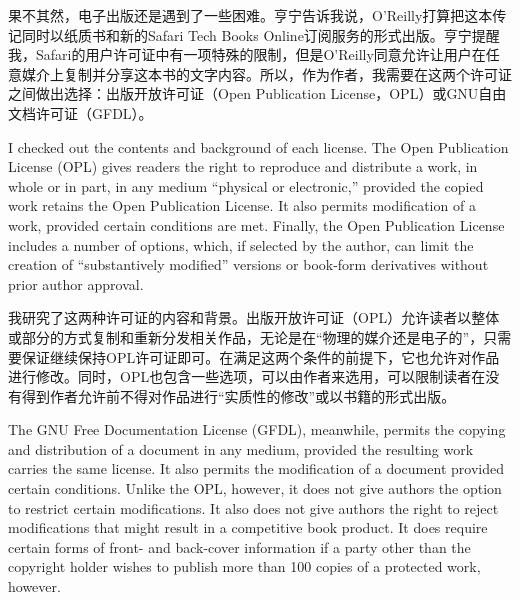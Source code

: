 \ifdefined\chs
果不其然，电子出版还是遇到了一些困难。亨宁告诉我说，O'Reilly打算把这本传记同时以纸质书和新的Safari Tech Books Online订阅服务的形式出版。亨宁提醒我，Safari的用户许可证中有一项特殊的限制，但是O'Reilly同意允许让用户在任意媒介上复制并分享这本书的文字内容。所以，作为作者，我需要在这两个许可证之间做出选择：出版开放许可证（Open Publication License，OPL）或GNU自由文档许可证（GFDL）。
\fi

\ifdefined\eng
I checked out the contents and background of each license. The Open Publication License (OPL) gives readers the right to reproduce and distribute a work, in whole or in part, in any medium ``physical or electronic,'' provided the copied work retains the Open Publication License. It also permits modification of a work, provided certain conditions are met. Finally, the Open Publication License includes a number of options, which, if selected by the author, can limit the creation of ``substantively modified'' versions or book-form derivatives without prior author approval.
\fi

\ifdefined\chs
我研究了这两种许可证的内容和背景。出版开放许可证（OPL）允许读者以整体或部分的方式复制和重新分发相关作品，无论是在``物理的媒介还是电子的''，只需要保证继续保持OPL许可证即可。在满足这两个条件的前提下，它也允许对作品进行修改。同时，OPL也包含一些选项，可以由作者来选用，可以限制读者在没有得到作者允许前不得对作品进行``实质性的修改''或以书籍的形式出版。
\fi

\ifdefined\eng
The GNU Free Documentation License (GFDL),  meanwhile, permits the copying and distribution of a document in any medium, provided the resulting work carries the same license. It also permits the modification of a document provided certain conditions. Unlike the OPL, however, it does not give authors the option to restrict certain modifications. It also does not give authors the right to reject modifications that might result in a competitive book product. It does require certain forms of front- and back-cover information if a party other than the copyright holder wishes to publish more than 100 copies of a protected work, however.
\fi

